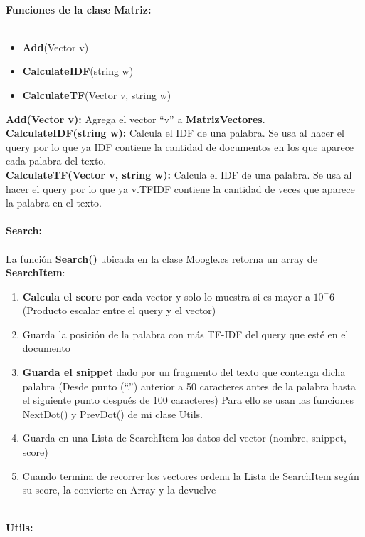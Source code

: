 \documentclass[10pt, letterpaper]{article}
\begin{document}
    \textbf{
        \\\large{Funciones de la clase Matriz:}\\
        \\
    }
    
    \begin{itemize}
        \item  \textbf{Add}(Vector v)
        \item \textbf{CalculateIDF}(string w)
        \item \textbf{CalculateTF}(Vector v, string w)
    \end{itemize}
    \textbf{Add(\textnormal{Vector v}):} Agrega el vector “v” a \textbf{MatrizVectores}. \\
    \textbf{CalculateIDF(\textnormal{string w}):} Calcula el IDF de una palabra. Se usa al hacer el query por lo que ya 
    IDF contiene la cantidad de documentos en los que aparece cada palabra del texto.\\
    \textbf{CalculateTF(\textnormal{Vector v, string w}):} Calcula el IDF de una palabra. Se usa al hacer el query por 
    lo que ya v.TFIDF contiene la cantidad de veces que aparece la palabra en el texto.\\
    
    \textbf{
        \\\large{Search:}\\
        \\
    }
    La función \textbf{Search()} ubicada en la clase Moogle.cs retorna un array de \textbf{SearchItem}:
    
    \begin{enumerate}
        \item \textbf{Calcula el score} por cada vector y solo lo muestra si es mayor a $10^-6$ (Producto 
        escalar entre el query y el vector)
        \item Guarda la posición de la palabra con más TF-IDF del query que esté en el documento
        \item \textbf{Guarda el snippet} dado por un fragmento del texto que contenga dicha palabra
        (Desde punto (“.”) anterior a 50 caracteres antes de la palabra hasta el 
        siguiente punto después de 100 caracteres)
        Para ello se usan las funciones NextDot() y PrevDot() de mi clase Utils.
        \item Guarda en una Lista de SearchItem los datos del vector (nombre, snippet, score)
        \item Cuando termina de recorrer los vectores ordena la Lista de SearchItem según su score, 
        la convierte en Array y la devuelve    
    \end{enumerate}
    \textbf{
        \\\large{Utils:}\\
        \\
    }
    
\end{document}

